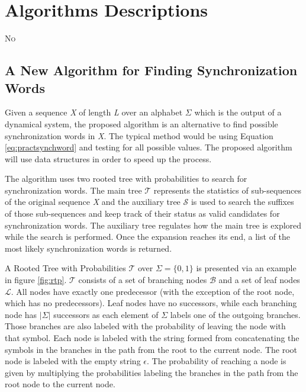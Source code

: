 \chapter{Algorithms Descriptions}\label{cap:3}



{\lettrine[loversize=0.25,findent=0.2em,nindent=0em]{N}{o}

\section{A New Algorithm for Finding Synchronization Words}

Given a sequence \textit{X} of length \textit{L} over an alphabet $\Sigma$ which is the output of a dynamical system, the proposed algorithm is an alternative to find possible synchronization words in \textit{X}. The typical method would be using Equation \ref{eq:practsynchword} and testing for all possible values.  The proposed algorithm will use data structures in order to speed up the process.

The algorithm uses two rooted tree with probabilities to search for synchronization words. The main tree $\mathcal{T}$ represents the statistics of sub-sequences of the original sequence \textit{X} and the auxiliary tree $\mathcal{S}$ is used to search the suffixes of those sub-sequences and keep track of their status as valid candidates for synchronization words. The auxiliary tree regulates how the main tree is explored while the search is performed. Once the expansion reaches its end, a list of the most likely synchronization words is returned.

A Rooted Tree with Probabilities $\mathcal{T}$ over $\Sigma = \{0, 1\}$ is presented via an example in figure \ref{fig:rtp}. $\mathcal{T}$ consists of a set of branching nodes $\mathcal{B}$ and a set of leaf nodes $\mathcal{L}$.  All nodes have exactly one predecessor (with the exception of the root node, which has no predecessors). Leaf nodes have no successors, while each branching node has $|\Sigma|$ successors as each element of $\Sigma$ labels one of the outgoing branches. Those branches are also labeled with the probability of leaving the node with that symbol. Each node is labeled with the string formed from concatenating the symbols in the branches in the path from the root to the current node. The root node is labeled with the empty string $\epsilon$. The probability of reaching a node is given by multiplying the probabilities labeling the branches in the path from the root node to the current node.

}
